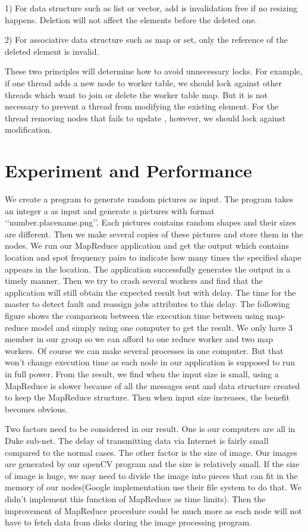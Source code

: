 \documentclass[12pt]{article}
\begin{document}
1) For data structure such as list or vector, add is invalidation free if no resizing happens. Deletion will not affect the elements before the deleted one.

2) For associative data structure such as map or set, only the reference of the deleted element is invalid.

These two principles will determine how to avoid unnecessary locks. For example, if one thread adds a new node to worker table, we should lock against other threads which want to join or delete the worker table map. But it is not necessary to prevent a thread from modifying the existing element. For the thread removing nodes that fails to update , however, we should lock against modification.        
   

\section{Experiment and Performance }

We create a program to generate random pictures as input. The program takes an integer a as input and generate a pictures with format \lq\lq number.placename.png\rq\rq.  Each pictures contains random shapes and their sizes are different. Then we make several copies of these pictures and store them in the nodes. We run our MapReduce application and get the output which contains location and spot frequency pairs to indicate how many times the specified shape appears in the location. The application successfully generates the output in a timely manner. Then we try to crash several workers and find that the application will still obtain the expected result but with delay. The time for the master to detect fault and reassign jobs attributes to this delay. The following figure shows the comparison between the execution time between using map-reduce model and simply using one computer to get the result. We only have 3 member in our group so we can afford to one reduce worker and two map workers. Of course we can make several processes in one computer. But that won't change execution time as each node in our application is supposed to run in full power. From the result, we find when the input size is small,  using a MapReduce is slower because of all the messages sent and data structure created to keep the MapReduce structure. Then when input size increases, the benefit becomes obvious. 

Two factors need to be considered in our result. One is our computers are all in Duke sub-net. The delay of transmitting data via Internet is fairly small compared to the normal cases. The other factor is the size of image. Our images are generated by our openCV program and the size is relatively small. If the size of image is huge, we may need to divide the image into pieces that can fit in the memory of our nodes(Google implementation use their file system to do that. We didn't implement this function of MapReduce as time limits). Then the improvement of MapReduce procedure could be much more as each node will not have to fetch data from disks during the image processing program.       
  
\end{document}
